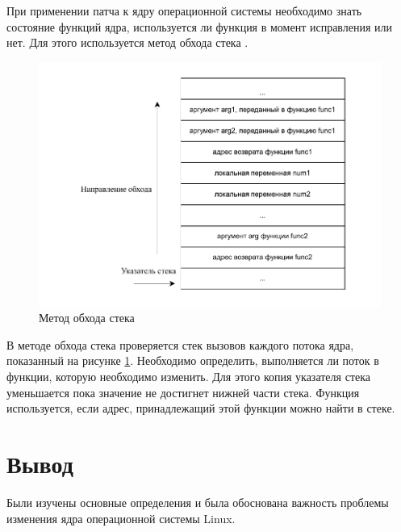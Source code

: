 При применении патча к ядру операционной системы необходимо знать состояние функций ядра, используется ли функция в момент исправления или нет. Для этого используется метод обхода стека \cite{lucos}.

\begin{figure}[H]
	\begin{center}
		\includegraphics[scale=0.9]{img/call-stack.pdf}
	\end{center}
	\captionsetup{justification=centering}
	\caption{Метод обхода стека}
	\label{img:call-stack}
\end{figure}

В методе обхода стека проверяется стек вызовов каждого потока ядра, показанный на рисунке \ref{img:call-stack}. Необходимо определить, выполняется ли поток в функции, которую необходимо изменить. Для этого копия указателя стека уменьшается пока значение не достигнет нижней части стека. Функция используется, если адрес, принадлежащий этой функции можно найти в стеке.


\section{Вывод}

Были изучены основные определения и была обоснована важность проблемы изменения ядра операционной системы Linux.